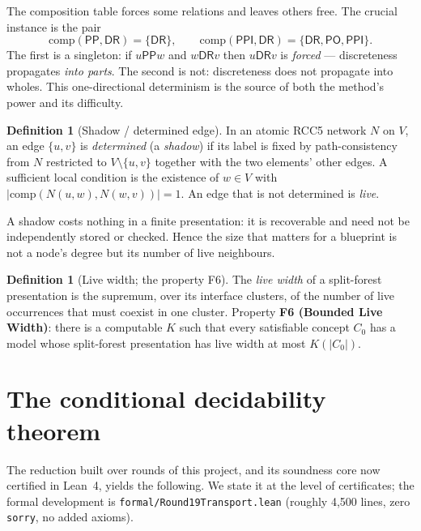 \documentclass[11pt]{article}
\newcommand{\Comp}{\mathrm{comp}}
\newcommand{\code}[1]{\texttt{#1}}
\newcommand{\DR}{\mathsf{DR}}
\newcommand{\PO}{\mathsf{PO}}
\newcommand{\PP}{\mathsf{PP}}
\newcommand{\PPI}{\mathsf{PPI}}
\theoremstyle{plain}
\theoremstyle{definition}
\newtheorem{definition}[theorem]{Definition}
\begin{document}
The composition table forces some relations and leaves others free. The
crucial instance is the pair
\begin{equation}\label{eq:downup}
\Comp(\PP,\DR)=\{\DR\}, \qquad
\Comp(\PPI,\DR)=\{\DR,\PO,\PPI\}.
\end{equation}
The first is a singleton: if $u\mathbin{\PP}w$ and $w\mathbin{\DR}v$
then $u\mathbin{\DR}v$ is \emph{forced} --- discreteness propagates
\emph{into parts}. The second is not: discreteness does not propagate
into wholes. This one-directional determinism is the source of both the
method's power and its difficulty.

\begin{definition}[Shadow / determined edge]\label{def:shadow}
In an atomic RCC5 network $N$ on $V$, an edge $\{u,v\}$ is
\emph{determined} (a \emph{shadow}) if its label is fixed by
path-consistency from $N$ restricted to $V\setminus\{u,v\}$ together
with the two elements' other edges. A sufficient local condition is the
existence of $w\in V$ with $|\Comp(N(u,w),N(w,v))|=1$. An edge that is
not determined is \emph{live}.
\end{definition}

A shadow costs nothing in a finite presentation: it is recoverable and
need not be independently stored or checked. Hence the size that
matters for a blueprint is not a node's degree but its number of live
neighbours.

\begin{definition}[Live width; the property F6]\label{def:width}
The \emph{live width} of a split-forest presentation is the supremum,
over its interface clusters, of the number of live occurrences that
must coexist in one cluster. Property \textbf{F6 (Bounded Live Width)}:
there is a computable $K$ such that every satisfiable concept $C_0$ has
a model whose split-forest presentation has live width at most
$K(|C_0|)$.
\end{definition}

\section{The conditional decidability theorem}\label{sec:conditional}

The reduction built over rounds of this project, and its soundness core
now certified in Lean~4, yields the following. We state it at the level
of certificates; the formal development is
\code{formal/Round19Transport.lean} (roughly 4{,}500 lines, zero
\code{sorry}, no added axioms).
\end{document}
